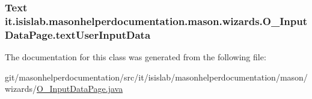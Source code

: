 \hypertarget{classit_1_1isislab_1_1masonhelperdocumentation_1_1mason_1_1wizards_1_1_o___input_data_page_a6a991af9288d1dff741881b12f02ee84}{
\subsubsection[{text\-User\-Input\-Data}]{\setlength{\rightskip}{0pt plus 5cm}Text it.\-isislab.\-masonhelperdocumentation.\-mason.\-wizards.\-O\-\_\-\-Input\-Data\-Page.\-text\-User\-Input\-Data\hspace{0.3cm}{\ttfamily [private]}}}\label{classit_1_1isislab_1_1masonhelperdocumentation_1_1mason_1_1wizards_1_1_o___input_data_page_a6a991af9288d1dff741881b12f02ee84}


The documentation for this class was generated from the following file\-:\begin{DoxyCompactItemize}
\item 
git/masonhelperdocumentation/src/it/isislab/masonhelperdocumentation/mason/wizards/\hyperlink{_o___input_data_page_8java}{O\-\_\-\-Input\-Data\-Page.\-java}\end{DoxyCompactItemize}
